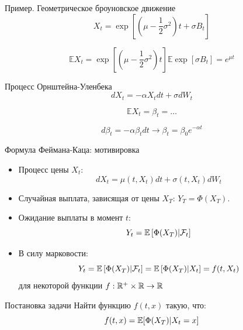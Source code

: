 \documentclass{beamer}
\begin{document}
\begin{frame}{Пример. Геометрическое броуновское движение}
    $$X_t = \exp\left[ \left( \mu - \dfrac{1}{2}\sigma^2 \right) t + \sigma B_t \right]$$
    
    $$
        \mathbb{E} X_t =   \exp \left[ \left( \mu - \dfrac{1}{2}\sigma^2 \right) t \right] \mathbb{E} \exp \left[
            \sigma B_t
        \right] =   e^{\mu t}
    $$
\end{frame}

\begin{frame}{Процесс Орнштейна-Уленбека}
    $$
        d X_t = -\alpha X_t dt + \sigma dW_t
    $$
      
    $$
        \mathbb{E} X_t = \beta_t = \ldots
    $$
      
    $$
        d \beta_t = -\alpha \beta_t dt \longrightarrow    \beta_t = \beta_0 e^{-\alpha t}  
    $$
\end{frame}


\begin{frame}{Формула Феймана-Каца: мотивировка}
    \begin{itemize}
        \item Процесс цены $X_t$:
        $$
            dX_t = \mu(t, X_t) dt + \sigma(t, X_t) dW_t
        $$
        \item Случайная выплата, зависящая от цены $X_T$: $Y_T = \Phi(X_T)$.
        \item Ожидание выплаты в момент $t$:
        $$
            Y_t = \mathbb{E} \left[ \Phi(X_T) | \mathcal{F}_t \right]
        $$
        \item В силу марковости:
        $$
            Y_t = \mathbb{E} \left[ \Phi(X_T) | \mathcal{F}_t \right] = \mathbb{E} \left[ \Phi(X_T) | X_t \right] = f(t, X_t)
        $$для некоторой функции $f : \mathbb{R}^+\times \mathbb{R} \to \mathbb{R}$
    \end{itemize}

    \begin{block}{Постановка задачи}
        Найти функцию $f(t,x)$ такую, что:
        $$
            f(t, x) = \mathbb{E}[\Phi(X_T) | X_t=x]
        $$
    \end{block}

\end{frame}
\end{document}
